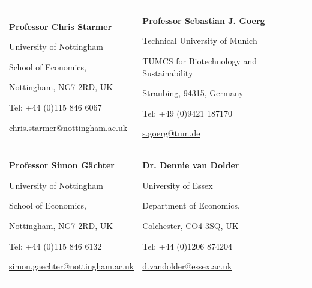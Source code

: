 

\begin{tabularx}{\textwidth}{@{}X X@{}}
\textbf{Professor Chris Starmer}\par
University of Nottingham\par
School of Economics,\par 
Nottingham, NG7 2RD, UK\par 
Tel: +44 (0)115 846 6067\par
\url{chris.starmer@nottingham.ac.uk}
&
\textbf{Professor Sebastian J. Goerg} \par
Technical University of Munich \par
TUMCS for Biotechnology and Sustainability \par
Straubing, 94315, Germany\par
Tel: +49 (0)9421 187170 \par
\url{s.goerg@tum.de}
\\[0.8cm]
\textbf{Professor Simon G{\"a}chter}\par
University of Nottingham\par
School of Economics,\par 
Nottingham, NG7 2RD, UK\par
Tel: +44 (0)115 846 6132\par
\url{simon.gaechter@nottingham.ac.uk}
&
\textbf{Dr. Dennie van Dolder}\par
University of Essex\par
Department of Economics,\par
Colchester, CO4 3SQ, UK \par
Tel: +44 (0)1206 874204\par
\url{d.vandolder@essex.ac.uk}
\\
\end{tabularx}


